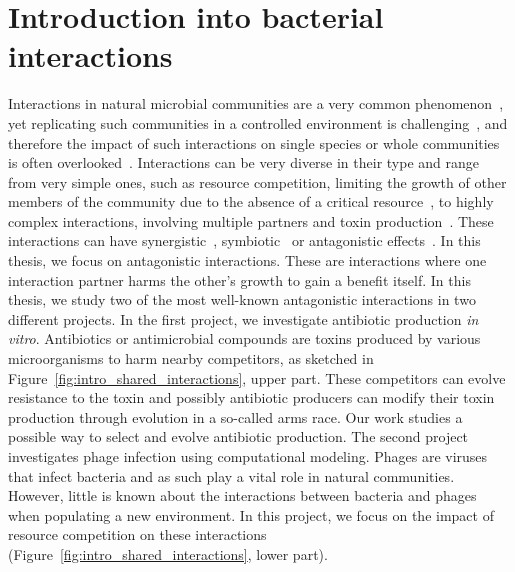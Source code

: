 \chapter{Introduction into bacterial interactions}
Interactions in natural microbial communities are a very common phenomenon~\cite{Weiland-Brauer2021-eq, Braga2016-fr}, yet replicating such communities in a controlled environment is challenging~\cite{Oriano2020-ro}, and therefore the impact of such interactions on single species or whole communities is often overlooked~\cite{Virgo2025-zv}. Interactions can be very diverse in their type and range from very simple ones, such as resource competition, limiting the growth of other members of the community due to the absence of a critical resource~\cite{Ghoul2016-qx, Bakkeren2025-fv}, to highly complex interactions, involving multiple partners and toxin production~\cite{Kerr2002-ny, Wright2016-bs}. These interactions can have synergistic~\cite{Sarsan2021-pn}, symbiotic~\cite{Pawlowska2024-go} or antagonistic effects~\cite{Feichtmayer2017-lv}. In this thesis, we focus on antagonistic interactions. These are interactions where one interaction partner harms the other's growth to gain a benefit itself. In this thesis, we study two of the most well-known antagonistic interactions in two different projects. In the first project, we investigate antibiotic production \textit{in vitro}. Antibiotics or antimicrobial compounds are toxins produced by various microorganisms to harm nearby competitors, as sketched in Figure~\ref{fig:intro_shared_interactions}, upper part. These competitors can evolve resistance to the toxin and possibly antibiotic producers can modify their toxin production through evolution in a so-called arms race. Our work studies a possible way to select and evolve antibiotic production. The second project investigates \gls{phage} infection using computational modeling. Phages are viruses that infect bacteria and as such play a vital role in natural communities. However, little is known about the interactions between bacteria and phages when populating a new environment. In this project, we focus on the impact of resource competition on these interactions (Figure~\ref{fig:intro_shared_interactions}, lower part).

